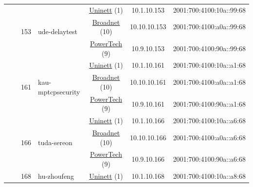 \begin{small}
\begin{center}
\begin{longtable}{|c|c|c|c|c|c|c|c|}
  &  & \multirow{3}{*}{\tiny{153}} & \multicolumn{1}{|l|}{\multirow{3}{*}{\tiny{ude-delaytest}}} & \multicolumn{2}{|c|}{\tiny{\href{https://www.uninett.no}{Uninett} (1)}} & \tiny{10.1.10.153} & \tiny{2001:700:4100:10a::99:68} \\* \cline{5-5}\cline{6-6}\cline{7-7}\cline{8-8}
  &  &  &  & \multicolumn{2}{|c|}{\tiny{\href{https://www.broadnet.no}{Broadnet} (10)}} & \tiny{10.10.10.153} & \tiny{2001:700:4100:a0a::99:68} \\* \cline{5-5}\cline{6-6}\cline{7-7}\cline{8-8}
  &  &  &  & \multicolumn{2}{|c|}{\tiny{\href{http://www.powertech.no}{PowerTech} (9)}} & \tiny{10.9.10.153} & \tiny{2001:700:4100:90a::99:68} \\* \cline{3-3}\cline{4-4}\cline{5-5}\cline{6-6}\cline{7-7}\cline{8-8}
  &  & \multirow{3}{*}{\tiny{161}} & \multicolumn{1}{|l|}{\multirow{3}{*}{\tiny{kau-mptcpsecurity}}} & \multicolumn{2}{|c|}{\tiny{\href{https://www.uninett.no}{Uninett} (1)}} & \tiny{10.1.10.161} & \tiny{2001:700:4100:10a::a1:68} \\* \cline{5-5}\cline{6-6}\cline{7-7}\cline{8-8}
  &  &  &  & \multicolumn{2}{|c|}{\tiny{\href{https://www.broadnet.no}{Broadnet} (10)}} & \tiny{10.10.10.161} & \tiny{2001:700:4100:a0a::a1:68} \\* \cline{5-5}\cline{6-6}\cline{7-7}\cline{8-8}
  &  &  &  & \multicolumn{2}{|c|}{\tiny{\href{http://www.powertech.no}{PowerTech} (9)}} & \tiny{10.9.10.161} & \tiny{2001:700:4100:90a::a1:68} \\* \cline{3-3}\cline{4-4}\cline{5-5}\cline{6-6}\cline{7-7}\cline{8-8}
  &  & \multirow{3}{*}{\tiny{166}} & \multicolumn{1}{|l|}{\multirow{3}{*}{\tiny{tuda-sereon}}} & \multicolumn{2}{|c|}{\tiny{\href{https://www.uninett.no}{Uninett} (1)}} & \tiny{10.1.10.166} & \tiny{2001:700:4100:10a::a6:68} \\* \cline{5-5}\cline{6-6}\cline{7-7}\cline{8-8}
  &  &  &  & \multicolumn{2}{|c|}{\tiny{\href{https://www.broadnet.no}{Broadnet} (10)}} & \tiny{10.10.10.166} & \tiny{2001:700:4100:a0a::a6:68} \\* \cline{5-5}\cline{6-6}\cline{7-7}\cline{8-8}
  &  &  &  & \multicolumn{2}{|c|}{\tiny{\href{http://www.powertech.no}{PowerTech} (9)}} & \tiny{10.9.10.166} & \tiny{2001:700:4100:90a::a6:68} \\* \cline{3-3}\cline{4-4}\cline{5-5}\cline{6-6}\cline{7-7}\cline{8-8}
  &  & \multirow{3}{*}{\tiny{168}} & \multicolumn{1}{|l|}{\multirow{3}{*}{\tiny{hu-zhoufeng}}} & \multicolumn{2}{|c|}{\tiny{\href{https://www.uninett.no}{Uninett} (1)}} & \tiny{10.1.10.168} & \tiny{2001:700:4100:10a::a8:68} \\* \cline{5-5}\cline{6-6}\cline{7-7}\cline{8-8}

\end{longtable}
\end{center}
\end{small}
